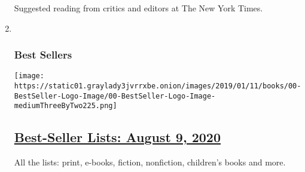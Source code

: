 \begin{enumerate}
  Suggested reading from critics and editors at The New York Times.
\item ~
  \hypertarget{best-sellers}{%
  \subsubsection{Best Sellers}\label{best-sellers}}

  \texttt{[image: https://static01.graylady3jvrrxbe.onion/images/2019/01/11/books/00-BestSeller-Logo-Image/00-BestSeller-Logo-Image-mediumThreeByTwo225.png]}

  \hypertarget{best-seller-lists-august-9-2020}{%
  \subsection{\texorpdfstring{\href{/interactive/2020/01/29/books/review/best-sellers-promo-for-front-copy2.html}{Best-Seller
  Lists: August 9,
  2020}}{Best-Seller Lists: August 9, 2020}}\label{best-seller-lists-august-9-2020}}

  All the lists: print, e-books, fiction, nonfiction, children's books
  and more.
\end{enumerate}

